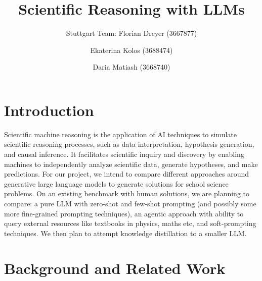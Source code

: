 \documentclass[10pt]{article}
\begin{document}
\title{Scientific Reasoning with LLMs}

\author{Stuttgart Team: Florian Dreyer (3667877) \and Ekaterina Kolos (3688474) \and Daria Matiash (3668740)}

\maketitle             


\section{Introduction}

Scientific machine reasoning is the application of AI techniques to simulate scientific reasoning processes, such as  data interpretation, hypothesis generation, and causal inference. It facilitates scientific inquiry and discovery by enabling machines to independently analyze scientific data, generate hypotheses, and make predictions.
For our project, we intend to compare different approaches around generative large language models to generate solutions for school science problems. On an existing benchmark with human solutions, we are planning to compare: a pure LLM with zero-shot and few-shot prompting (and possibly some more fine-grained prompting techniques), an agentic approach with ability to query external resources like textbooks in physics, maths etc, and soft-prompting techniques. We then plan to attempt knowledge distillation to a smaller LLM. 

\section{Background and Related Work}
\end{document}
